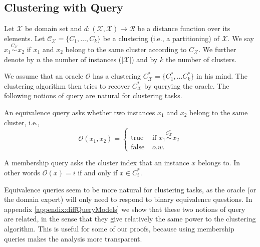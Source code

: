 \documentclass[orivec]{llncs}
\newcommand{\mc}{\mathcal}
\begin{document}
\subsection{Clustering with Query}

Let $\mc X$ be domain set and $d:(\mc X, \mc X) \rightarrow \mc R $ be a distance function over its elements. Let $\mc C_{\mc X} = \{C_1, \ldots, C_k\}$ be a clustering (i.e., a partitioning) of $\mc X$. We say $x_1 \overset{C_{\mc X}}{\sim} x_2$ if $x_1$ and $x_2$ belong to the same cluster according to $C_{\mc X}$. We further denote by $n$ the number of instances ($|{\mc X}|$) and by $k$ the number of clusters.

We assume that an oracle $\mc O$ has a clustering $C^*_{\mc X}=\{ C^*_1, \ldots C^*_k\}$ in his mind. The clustering algorithm then tries to recover $C^*_{\mc X}$ by querying the oracle. The following notions of query are natural for clustering tasks.

\begin{definition}
An equivalence query asks whether two instances $x_1$ and $x_2$ belong to the same cluster, i.e., 
$${\mc O}(x_1, x_2) = \left\{
	\begin{array}{ll}
		\mbox{true }  & \mbox{if } x_1 \overset{C^*_{\mc X}}{\sim} x_2   \\
		\mbox{false } & o.w. 
	\end{array}
\right. $$
\end{definition}

\begin{definition}
A membership query asks the cluster index that an instance $x$ belongs to. In other words ${\mc O}(x) = i$ if and only if $x \in C^*_i$.
\end{definition}

Equivalence queries seem to be more natural for clustering tasks, as the oracle (or the domain expert) will only need to respond to binary equivalence questions. In appendix \ref{appendix:diffQueryModels} we show that these two notions of query are related, in the sense that they give relatively the same power to the clustering algorithm. This is useful for some of our proofs, because using membership queries makes the analysis more transparent.
\end{document}
